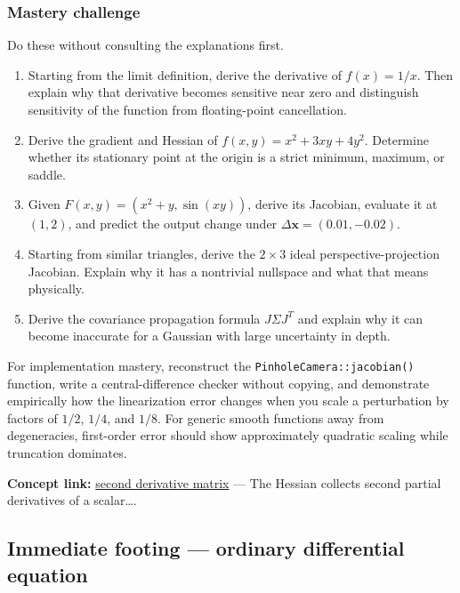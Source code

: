 \subsubsection{Mastery challenge}\label{02-foundations-ii-ch021-mastery-challenge}

Do these without consulting the explanations first.

\begin{enumerate}
\def\labelenumi{\arabic{enumi}.}
\tightlist
\item
  Starting from the limit definition, derive the derivative of \(f(x)=1/x\). Then explain why that derivative becomes sensitive near zero and distinguish sensitivity of the function from floating-point cancellation.
\item
  Derive the gradient and Hessian of \(f(x,y)=x^2+3xy+4y^2\). Determine whether its stationary point at the origin is a strict minimum, maximum, or saddle.
\item
  Given \(F(x,y)=(x^2+y,\sin(xy))\), derive its Jacobian, evaluate it at \((1,2)\), and predict the output change under \(\Delta\mathbf x=(0.01,-0.02)\).
\item
  Starting from similar triangles, derive the \(2\times3\) ideal perspective-projection Jacobian. Explain why it has a nontrivial nullspace and what that means physically.
\item
  Derive the covariance propagation formula \(J\Sigma J^T\) and explain why it can become inaccurate for a Gaussian with large uncertainty in depth.
\end{enumerate}

For implementation mastery, reconstruct the \texttt{PinholeCamera::jacobian()} function, write a central-difference checker without copying, and demonstrate empirically how the linearization error changes when you scale a perturbation by factors of \(1/2\), \(1/4\), and \(1/8\). For generic smooth functions away from degeneracies, first-order error should show approximately quadratic scaling while truncation dominates.

\textbf{Concept link:} \hyperref[02-foundations-ii-ch021-jacobians-curvature-and-local-approximation]{second derivative matrix} --- The Hessian collects second partial derivatives of a scalar\ldots.

\subsection{Immediate footing --- ordinary differential equation}\label{02-foundations-ii-ch021-immediate-footing-ordinary-differential-equation}

